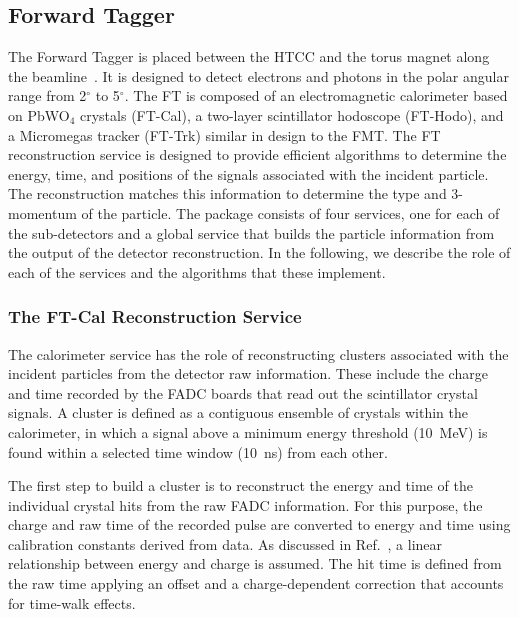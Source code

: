 \subsection{Forward Tagger}

The Forward Tagger is placed between the HTCC and the torus magnet along the beamline~\cite{ft-nim}.
It is designed to detect electrons and photons in the polar angular range from 2$^\circ$ to 5$^\circ$. The
FT is composed of an electromagnetic calorimeter based on PbWO$_4$ crystals (FT-Cal), a two-layer scintillator
hodoscope (FT-Hodo), and a Micromegas tracker (FT-Trk) similar in design to the FMT. The FT reconstruction
service is designed to provide efficient algorithms to determine the energy, time, and positions of the signals
associated with the incident particle. The reconstruction matches this information to determine the type and
3-momentum of the particle. The package consists of four services, one for each of the sub-detectors and a global
service that builds the particle information from the output of the detector reconstruction. In the following, we
describe the role of each of the services and the algorithms that these implement.

\subsubsection{The FT-Cal Reconstruction Service}

The calorimeter service has the role of reconstructing clusters associated with the incident particles from the
detector raw information. These include the charge and time recorded by the FADC boards that read out the
scintillator crystal signals. A cluster is defined as a contiguous ensemble of crystals within the calorimeter, in which
a signal above a minimum energy threshold (10~MeV) is found within a selected time window (10~ns) from each other.

The first step to build a cluster is to reconstruct the energy and time of the individual crystal hits from the raw
FADC information. For this purpose, the charge and raw time of the recorded pulse are converted to energy and
time using calibration constants derived from data. As discussed in Ref.~\cite{ft-nim}, a linear relationship between
energy and charge is assumed. The hit time is defined from the raw time applying an offset and a charge-dependent
correction that accounts for time-walk effects.

